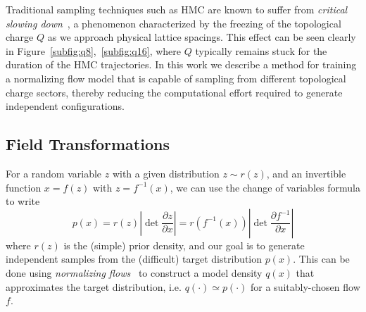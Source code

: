 \documentclass[a4paper,11pt]{article}
\begin{document}
Traditional sampling techniques such as HMC are known to suffer from
\emph{critical slowing down}~\cite{Schaefer:2010hu}, a phenomenon characterized
by the freezing of the topological charge \(Q\) as we approach physical lattice
spacings.
%
This effect can be seen clearly in Figure~\ref{subfig:q8},~\ref{subfig:q16},
where \(Q\) typically remains stuck for the duration of the HMC trajectories.
%
In this work we describe a method for training a normalizing flow model that is
capable of sampling from different topological charge sectors, thereby reducing
the computational effort required to generate independent configurations.
%

\subsection{\label{subsec:ft}Field Transformations}
%
For a random variable \(z\) with a given distribution \(z \sim r(z)\), and an
invertible function \(x = f(z)\) with \(z = f^{-1}(x)\), we can use the change
of variables formula to write
%
\begin{equation}
    p(x) = r(z)\left|\det\frac{\partial z}{\partial x}\right| =
    r(f^{-1}(x))\left|\det\frac{\partial f^{-1}}{\partial x}\right|
\end{equation}
%
where \(r(z)\) is the (simple) prior density, and our goal is to generate
independent samples from the (difficult) target distribution \(p(x)\).
%
This can be done using \emph{normalizing flows}~\cite{rezende2015variational}
to construct a model density \(q(x)\) that approximates the target
distribution, i.e. \(q(\cdot)\simeq p(\cdot)\) for a suitably-chosen flow
\(f\).
\end{document}
